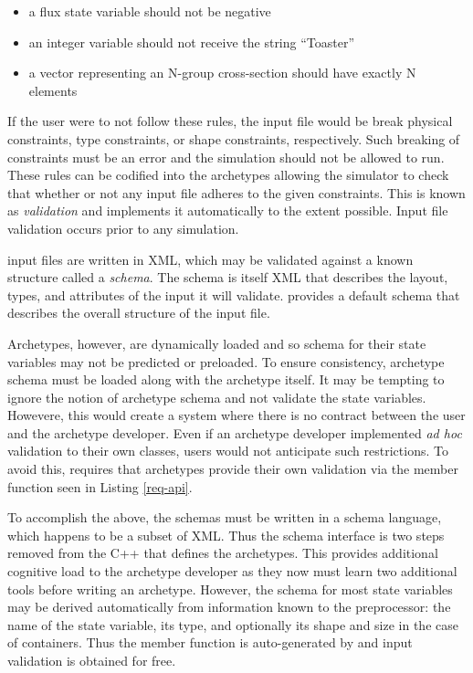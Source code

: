 \begin{itemize} 
    \item a flux state variable should not be negative
    \item an integer variable should not receive the string ``Toaster''
    \item a vector representing an N-group cross-section should have exactly N 
          elements
\end{itemize} 
If the user were to not follow these rules, the input file would be break physical
constraints, type constraints, or shape constraints, respectively. 
Such breaking of constraints must be an error and the simulation should not be 
allowed to run. 
These rules can be codified into the archetypes allowing 
the simulator to check that whether or not any input file adheres to the 
given constraints. This is known as \emph{validation} and \cyclus implements 
it automatically to the extent possible. Input file validation occurs prior
to any simulation. 


\Cyclus input files are written in \gls{XML}, which  may be validated against a 
known structure called a \emph{schema}. The schema is itself \gls{XML} that describes 
the layout, types, and attributes of the input it will validate.
\Cyclus provides a default schema that describes the overall structure of the 
input file.

Archetypes, however, are dynamically loaded and so schema for their state 
variables may not be predicted or preloaded. To ensure consistency, archetype schema 
must be loaded along with the archetype itself.  It may be tempting to ignore the 
notion of archetype schema and not validate the state variables. 
Howevere, this would
create a system where there is no contract between the 
user and the archetype developer. Even if an archetype developer implemented 
\emph{ad hoc} validation to their own classes, users would not
anticipate such 
restrictions.  To avoid this, \cyclus requires
that archetypes provide their own validation via the  member 
function seen in Listing \ref{req-api}.

To accomplish the
above, the schemas must be written in a schema language, which happens to be a 
subset of \gls{XML}. Thus the schema interface is two steps removed from the C++ that 
defines the archetypes. 
This provides additional 
cognitive load to the archetype developer as they now must learn two additional
tools before writing an archetype. However, the schema for most state
variables may be derived automatically from information known to the preprocessor:
the name of the state variable, its type, and optionally its shape and size in 
the case of containers. Thus the  member function is auto-generated
by \cycpp and input validation is obtained for free. 

